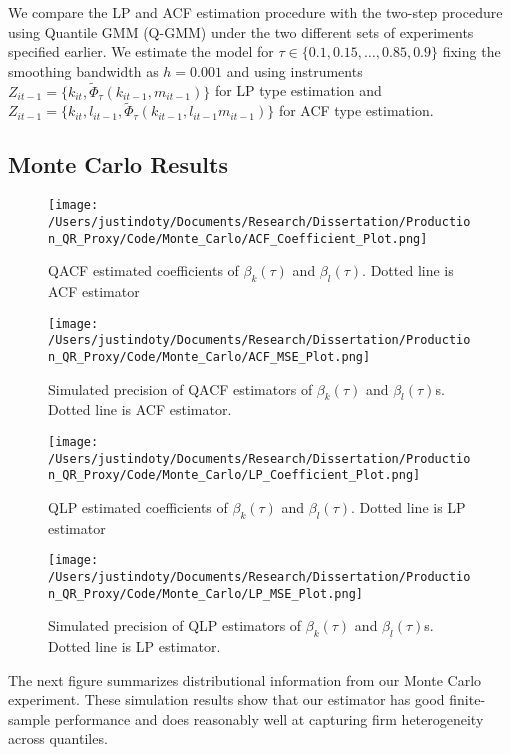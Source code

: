 \documentclass[11pt]{article}
\begin{document}
We compare the LP and ACF estimation procedure with the two-step procedure using Quantile GMM (Q-GMM) under  the two different sets of experiments specified earlier. We estimate the model for $\tau\in\{0.1, 0.15, \dots, 0.85, 0.9\}$ fixing the smoothing bandwidth as $h=0.001$ and using instruments $Z_{it-1}=\{k_{it}, \tilde{\Phi}_{\tau}(k_{it-1}, m_{it-1})\}$ for LP type estimation and $Z_{it-1}=\{k_{it}, l_{it-1}, \tilde{\Phi}_{\tau}(k_{it-1}, l_{it-1} m_{it-1})\}$ for ACF type estimation.
 

\subsection{Monte Carlo Results}

\begin{figure}[H]
\centering
\caption{QACF estimated coefficients of  $\beta_{k}(\tau)$ and $\beta_{l}(\tau)$. Dotted line is ACF estimator}
\texttt{[image: /Users/justindoty/Documents/Research/Dissertation/Production\_QR\_Proxy/Code/Monte\_Carlo/ACF\_Coefficient\_Plot.png]}
\label{ACF_coefficient_plot}
\end{figure}

\begin{figure}[H]
\centering
\caption{Simulated precision of QACF estimators of $\beta_{k}(\tau)$ and $\beta_{l}(\tau)$s. Dotted line is ACF estimator.}
\texttt{[image: /Users/justindoty/Documents/Research/Dissertation/Production\_QR\_Proxy/Code/Monte\_Carlo/ACF\_MSE\_Plot.png]}
\label{MSE_plot}
\end{figure}

\begin{figure}[H]
\centering
\caption{QLP estimated coefficients of  $\beta_{k}(\tau)$ and $\beta_{l}(\tau)$. Dotted line is LP estimator}
\texttt{[image: /Users/justindoty/Documents/Research/Dissertation/Production\_QR\_Proxy/Code/Monte\_Carlo/LP\_Coefficient\_Plot.png]}
\label{LP_coefficient_plot}
\end{figure}


\begin{figure}[H]
\centering
\caption{Simulated precision of  QLP estimators of $\beta_{k}(\tau)$ and $\beta_{l}(\tau)$s. Dotted line is LP estimator.}
\texttt{[image: /Users/justindoty/Documents/Research/Dissertation/Production\_QR\_Proxy/Code/Monte\_Carlo/LP\_MSE\_Plot.png]}
\label{MSE_plot}
\end{figure}


The next figure summarizes distributional information from our Monte Carlo experiment. These simulation results show that our estimator has good finite-sample performance and does reasonably well at capturing firm heterogeneity across quantiles.
\end{document}
